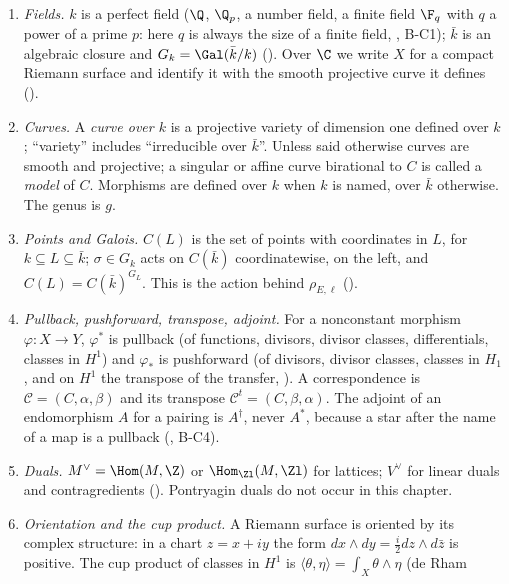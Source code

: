 \begin{convention}\label{conv:curves:conventions}
\leavevmode
\begin{enumerate}[label=(C\arabic*)]
\item \emph{Fields.} $k$ is a perfect field ($\Q$, $\Q_p$, a number field, a finite field $\F_q$ with $q$ a power of a prime
$p$: here $q$ is always the size of a finite field, , B-C1); $\bar k$ is an algebraic closure and
$G_k=\Gal(\bar k/k)$ (). Over $\C$ we write $X$ for a compact Riemann surface and identify it with the smooth
projective curve it defines ().
\item \emph{Curves.} A \emph{curve over $k$} is a projective variety of dimension one defined over $k$; ``variety'' includes
``irreducible over $\bar k$''. Unless said otherwise curves are smooth and projective; a singular or affine curve
birational to $C$ is called a \emph{model} of $C$. Morphisms are defined over $k$ when $k$ is named, over $\bar k$ otherwise.
The genus is $g$.
\item \emph{Points and Galois.} $C(L)$ is the set of points with coordinates in $L$, for $k\subseteq L\subseteq\bar k$; $\sigma\in G_k$ acts on
$C(\bar k)$ coordinatewise, on the left, and $C(L)=C(\bar k)^{G_L}$. This is the action behind $\rho_{E,\ell}$ ().
\item \emph{Pullback, pushforward, transpose, adjoint.} For a nonconstant morphism $\varphi\colon X\to Y$, $\varphi^*$ is pullback (of functions,
divisors, divisor classes, differentials, classes in $H^1$) and $\varphi_*$ is pushforward (of divisors, divisor classes, classes in
$H_1$, and on $H^1$ the transpose of the transfer, ). A correspondence is $\mathcal C=(C,\alpha,\beta)$ and its
transpose $\mathcal C^t=(C,\beta,\alpha)$. The adjoint of an endomorphism $A$ for a pairing is $A^\dagger$, never $A^*$, because a star after
the name of a map is a pullback (, B-C4).
\item \emph{Duals.} $M^\vee=\Hom(M,\Z)$ or $\Hom_{\Zl}(M,\Zl)$ for lattices; $V^\vee$ for linear duals and contragredients ().
Pontryagin duals do not occur in this chapter.
\item \emph{Orientation and the cup product.} A Riemann surface is oriented by its complex structure: in a chart $z=x+iy$ the form
$dx\wedge dy=\frac i2dz\wedge d\bar z$ is positive. The cup product of classes in $H^1$ is $\langle\theta,\eta\rangle=\int_X\theta\wedge\eta$ (de Rham

\end{enumerate}
\end{convention}
